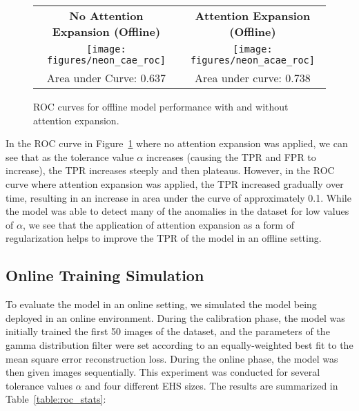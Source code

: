 \documentclass[12pt]{article}
\begin{document}
\begin{figure}[H]
\begin{center}
\begin{tabular}{c | c}
\textbf{No Attention Expansion (Offline)} & \textbf{Attention Expansion (Offline)}\\
\texttt{[image: figures/neon\_cae\_roc]} & \texttt{[image: figures/neon\_acae\_roc]} \\
Area under Curve:  0.637 & Area under curve: 0.738 \\ 
\end{tabular}
\end{center}

\caption{ROC curves for offline model performance with and without attention expansion.}
\label{fig:attention_rocs}
\end{figure}

In the ROC curve in Figure~\ref{fig:attention_rocs} where no attention expansion was applied, we can see that as the tolerance value $\alpha$ increases (causing  the TPR and FPR to increase), the TPR increases steeply and then plateaus. However, in the ROC curve where attention expansion was applied, the TPR increased gradually over time, resulting in an increase in area under the curve of approximately 0.1. While the model was able to detect many of the anomalies in the dataset for low values of $\alpha$, we see that the application of attention expansion as a form  of regularization helps to improve the TPR of the model in an offline setting.

\subsection{Online Training Simulation}

To evaluate the model in an online setting, we simulated the model being deployed in an online environment. During the calibration phase, the model was initially trained the first 50 images of the dataset, and the parameters of the gamma distribution filter were set according to an equally-weighted best fit to the mean square error reconstruction loss. During the online phase, the model was then given images sequentially. This experiment was conducted for several tolerance values $\alpha$ and four different EHS sizes. The results are summarized in Table~\ref{table:roc_stats}:
\end{document}
